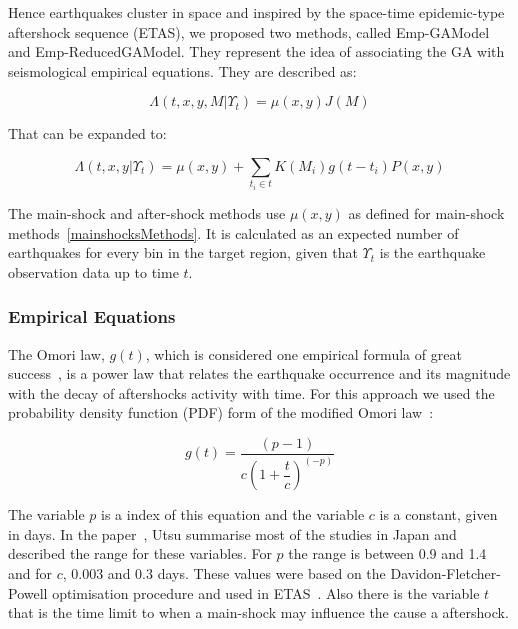 Hence earthquakes cluster in space and inspired by the space-time epidemic-type aftershock sequence (ETAS), we proposed two methods, called Emp-GAModel and Emp-ReducedGAModel. They represent the idea of associating the GA with seismological empirical equations. They are described as:

\begin{equation}\label{reducedgamodel}
	\Lambda(t,x,y,M|\Upsilon_t) = \mu(x,y)J(M)
\end{equation}

That can be expanded to:

\begin{equation}\label{emp-model}
 \Lambda(t,x,y|\Upsilon_t) = \mu(x,y) + \displaystyle\sum_{t_i \in t} K(M_i)g(t-t_i)P(x,y)
\end{equation}

The main-shock and after-shock methods use $\mu(x,y)$ as defined for main-shock methods~\ref{mainshocksMethods}. It is calculated as an expected number of earthquakes for every bin in the target region, given that $\Upsilon_t$ is the earthquake observation data up to time $t$.\\

\subsubsection{Empirical Equations}

The Omori law, $g(t)$, which is considered one empirical formula of great success~\cite{zhuang2004analyzing}\cite{utsu1995centenary}\cite{omori1895after}, is a power law that relates the earthquake occurrence and its magnitude with the decay of aftershocks activity with time. For this approach we used the probability density function (PDF) form of the modified Omori law~\cite{zhuang2004analyzing}:

\begin{equation}\label{omori}
	g(t)= \dfrac{(p-1)}{c(1+ \dfrac{t}{c})^(-p)}
\end{equation}

The variable $p$ is a index of this equation and the variable $c$ is a constant, given in days. In the paper~\cite{utsu1995centenary}, Utsu summarise most of the studies in Japan and described the range for these variables. For $p$ the range is between 0.9 and 1.4 and for $c$, 0.003 and 0.3 days. These values were based on the Davidon-Fletcher-Powell optimisation procedure and used in ETAS~\cite{utsu1995centenary}. Also there is the variable $t$ that is the time limit to when a main-shock may influence the cause a aftershock.\\

